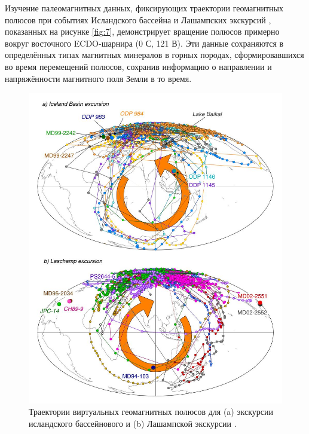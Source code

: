 \documentclass[10pt,twocolumn,letterpaper]{article}
\begin{document}
Изучение палеомагнитных данных, фиксирующих траектории геомагнитных полюсов при событиях Исландского бассейна и Лашампских экскурсий \cite{35}, показанных на рисунке \ref{fig:7}, демонстрирует вращение полюсов примерно вокруг восточного ECDO-шарнира (0 С, 121 В). Эти данные сохраняются в определённых типах магнитных минералов в горных породах, сформировавшихся во время перемещений полюсов, сохранив информацию о направлении и напряжённости магнитного поля Земли в то время.
\begin{figure}[t]
\begin{center}
   \includegraphics[width=0.95\linewidth]{laj.jpg}
\end{center}
   \caption{Траектории виртуальных геомагнитных полюсов для (a) экскурсии исландского бассейнового и (b) Лашампской экскурсии \cite{35}.}
\label{fig:7}
\label{fig:onecol}
\end{figure}
\end{document}
